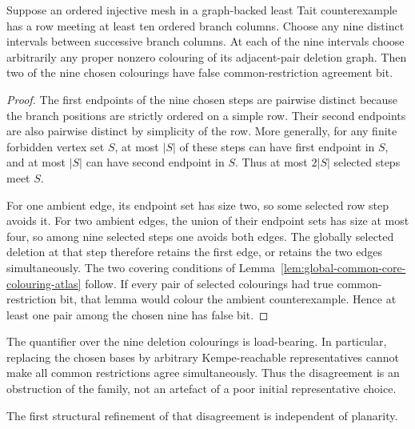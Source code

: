 \begin{corollary}
\label{cor:ordered-row-common-core-disagreement}
Suppose an ordered injective mesh in a graph-backed least Tait
counterexample has a row meeting at least ten ordered branch columns.  Choose
any nine distinct intervals between successive branch columns.  At each of
the nine intervals choose arbitrarily any proper nonzero colouring of its
adjacent-pair deletion graph.  Then two of the nine chosen colourings have
false common-restriction agreement bit.
\end{corollary}

\begin{proof}
The first endpoints of the nine chosen steps are pairwise distinct because
the branch positions are strictly ordered on a simple row.  Their second
endpoints are also pairwise distinct by simplicity of the row.  More
generally, for any finite forbidden vertex set \(S\), at most \(|S|\) of
these steps can have
first endpoint in \(S\), and at most \(|S|\) can have second endpoint in
\(S\).  Thus at most \(2|S|\) selected steps meet \(S\).

For one ambient edge, its endpoint set has size two, so some selected row
step avoids it.  For two ambient edges, the union of their endpoint sets has
size at most four, so among nine selected steps one avoids both edges.  The
globally selected deletion at that step therefore retains the first edge, or
retains the two edges simultaneously.  The two covering conditions of
Lemma~\ref{lem:global-common-core-colouring-atlas} follow.  If every pair of
selected colourings had true common-restriction bit, that lemma would colour
the ambient counterexample.  Hence at least one pair among the chosen nine
has false bit.
\end{proof}

The quantifier over the nine deletion colourings is load-bearing.  In
particular, replacing the chosen bases by arbitrary Kempe-reachable
representatives cannot make all common restrictions agree simultaneously.
Thus the disagreement is an obstruction of the family, not an artefact of a
poor initial representative choice.

The first structural refinement of that disagreement is independent of
planarity.

